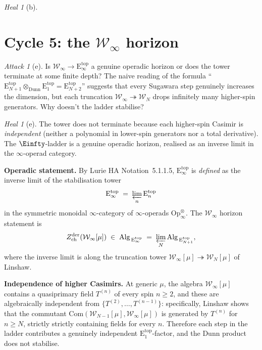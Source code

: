 \documentclass{article}
\theoremstyle{definition}
\theoremstyle{remark}
\newtheorem{attack}[theorem]{Attack}
\newtheorem{heal}[theorem]{Heal}
\newcommand{\Zder}{Z^{\mathrm{der}}_{\mathrm{ch}}}
\newcommand{\Etop}[1]{\mathrm{E}_{#1}^{\mathrm{top}}}
\newcommand{\cW}{\mathcal{W}}
\begin{document}
\begin{heal}[b]
\section{Cycle 5: the $\cW_\infty$ horizon}
\label{sec:opus-cycle-5}

\begin{attack}[e]
\label{att:cycle5}
Is $\cW_\infty \to \Etop{\infty}$ a genuine operadic horizon
or does the tower terminate at some finite depth? The naive
reading of the formula
``$\Etop{N+1} \otimes_{\mathrm{Dunn}} \Etop{1} =
\Etop{N+2}$'' suggests that every Sugawara step genuinely
increases the dimension, but each truncation
$\cW_\infty \twoheadrightarrow \cW_N$ drops infinitely many
higher-spin generators. Why doesn't the ladder stabilise?
\end{attack}

\begin{heal}[e]
\label{heal:cycle5}
The tower does not terminate because each higher-spin
Casimir is \emph{independent} (neither a polynomial in
lower-spin generators nor a total derivative). The
$\Einfty$-ladder is a genuine operadic horizon, realised
as an inverse limit in the $\infty$-operad category.

\textbf{Operadic statement.} By
Lurie HA Notation~5.1.1.5, $\Etop{\infty}$ is \emph{defined}
as the inverse limit of the stabilisation tower
\begin{equation}\label{eq:opus-Einfty-def}
  \Etop{\infty} \;=\; \varprojlim_n \Etop{n}
\end{equation}
in the symmetric monoidal $\infty$-category of
$\infty$-operads
$\mathrm{Op}_\infty^{\otimes}$. The $\cW_\infty$ horizon
statement is
\begin{equation}\label{eq:opus-Winfty-horizon}
  \Zder(\cW_\infty[\mu]) \;\in\;
  \mathrm{Alg}_{\,\Etop{\infty}}
  \;=\; \varprojlim_N \mathrm{Alg}_{\,\Etop{N+1}},
\end{equation}
where the inverse limit is along the truncation tower
$\cW_\infty[\mu] \twoheadrightarrow \cW_N[\mu]$ of Linshaw.

\textbf{Independence of higher Casimirs.} At generic $\mu$,
the algebra $\cW_\infty[\mu]$ contains a quasiprimary field
$T^{(n)}$ of every spin $n \ge 2$, and these are
algebraically independent from $\{T^{(2)}, \ldots,
T^{(n-1)}\}$: specifically, Linshaw shows that the commutant
$\mathrm{Com}(\cW_{N-1}[\mu], \cW_\infty[\mu])$ is
generated by $T^{(n)}$ for $n \ge N$, strictly strictly
containing fields for every $n$. Therefore each step in the
ladder contributes a genuinely independent $\Etop{1}$-factor,
and the Dunn product does not stabilise.


\end{heal}
\end{heal}
\end{document}
